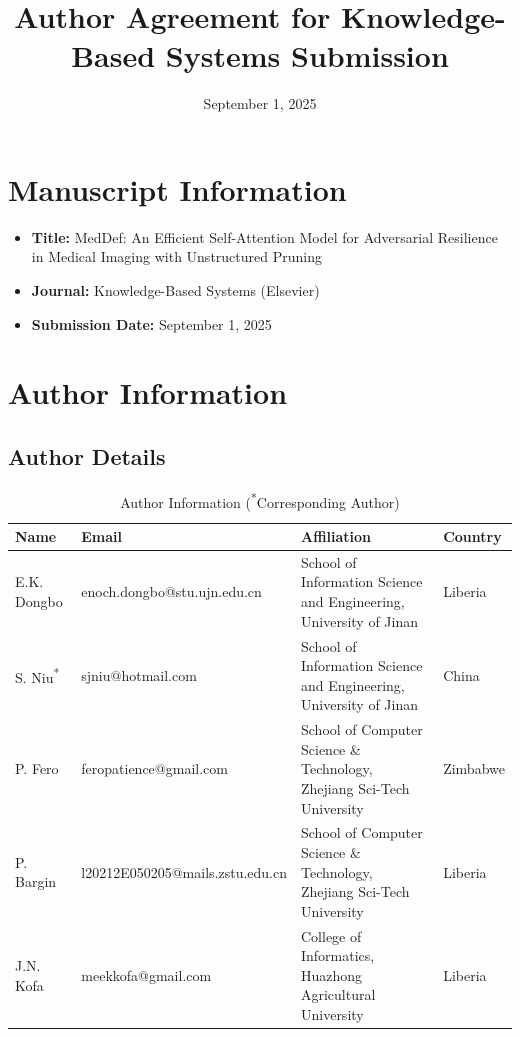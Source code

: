\documentclass[12pt]{article}
\begin{document}
\title{\textbf{Author Agreement for Knowledge-Based Systems Submission}}
\date{September 1, 2025}
\maketitle

\section*{Manuscript Information}
\begin{itemize}
    \item \textbf{Title:} MedDef: An Efficient Self-Attention Model for Adversarial Resilience in Medical Imaging with Unstructured Pruning
    \item \textbf{Journal:} Knowledge-Based Systems (Elsevier)
    \item \textbf{Submission Date:} September 1, 2025
\end{itemize}

\section*{Author Information}

\subsection*{Author Details}
\begin{table}[h!]
\centering
\footnotesize
\begin{tabularx}{\textwidth}{p{2.2cm}X p{3.8cm}p{1.8cm}}
\toprule
\textbf{Name} & \textbf{Email} & \textbf{Affiliation} & \textbf{Country} \\
\midrule
E.K. Dongbo & enoch.dongbo@stu.ujn.edu.cn & School of Information Science and Engineering, University of Jinan & Liberia \\
\midrule
S. Niu\textsuperscript{*} & sjniu@hotmail.com & School of Information Science and Engineering, University of Jinan & China \\
\midrule
P. Fero & feropatience@gmail.com & School of Computer Science \& Technology, Zhejiang Sci-Tech University & Zimbabwe \\
\midrule
P. Bargin & l20212E050205@mails.zstu.edu.cn & School of Computer Science \& Technology, Zhejiang Sci-Tech University & Liberia \\
\midrule
J.N. Kofa & meekkofa@gmail.com & College of Informatics, Huazhong Agricultural University & Liberia \\
\bottomrule
\end{tabularx}
\caption{Author Information (\textsuperscript{*}Corresponding Author)}
\end{table}
\end{document}
